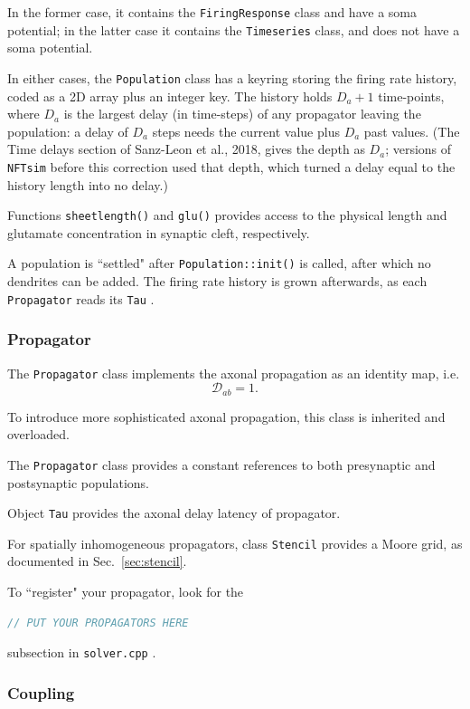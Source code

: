 \documentclass[12pt,a4paper]{article}
\newcommand{\type}[1]{{\small\small\tt #1} }
\newcommand{\NF}[0]{\type{NFTsim}}
\begin{document}
In the former case, it contains the \type{FiringResponse} class and have a soma potential; in the latter case it contains the \type{Timeseries} class, and does not have a soma potential.

In either cases, the \type{Population} class has a keyring storing the firing rate history, coded as a 2D array plus an integer key.
The history holds \(D_a + 1\) time-points, where \(D_a\) is the largest delay (in time-steps) of any propagator leaving the population: a delay of \(D_a\) steps needs the current value plus \(D_a\) past values.
(The Time delays section of Sanz-Leon et al., 2018, gives the depth as \(D_a\); versions of \NF before this correction used that depth, which turned a delay equal to the history length into no delay.)

Functions \type{sheetlength()} and \type{glu()} provides access to the physical length and glutamate concentration in synaptic cleft, respectively.

A population is ``settled" after \type{Population::init()} is called, after which no dendrites can be added.
The firing rate history is grown afterwards, as each \type{Propagator} reads its \type{Tau}.

\subsubsection{Propagator}
\label{sec:propagator}

The \type{Propagator} class implements the axonal propagation as an identity map, i.e.
\[ \mathcal{D}_{ab} = 1. \]

To introduce more sophisticated axonal propagation, this class is inherited and overloaded.

The \type{Propagator} class provides a constant references to both presynaptic and postsynaptic populations.

Object \type{Tau} provides the axonal delay latency of propagator.

For spatially inhomogeneous propagators, class \type{Stencil} provides a Moore grid, as documented in Sec.~\ref{sec:stencil}.

To ``register" your propagator, look for the
\begin{lstlisting}[language=C++]
// PUT YOUR PROPAGATORS HERE
\end{lstlisting}
subsection in \type{solver.cpp}.

\subsubsection{Coupling}
\label{sec:coupling_conf}
\end{document}
